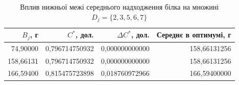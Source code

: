 \begin{table}[htbp]
\centering\small
\caption{Вплив нижньої межі середнього надходження білка на множині $D_j=\{2,3,5,6,7\}$}
\label{tab:glpk-multiday-protein}
\begin{tabular}{rrrr}
\toprule
$B_j$, г & $C^*$, дол. & $\Delta C^*$, дол. & Середнє в оптимумі, г \\
\midrule
74{,}90000 & 0{,}796714750932 & 0{,}000000000000 & 158{,}66131256 \\
158{,}66131 & 0{,}796714750932 & 0{,}000000000000 & 158{,}66131256 \\
166{,}59400 & 0{,}815475723898 & 0{,}018760972966 & 166{,}59400000 \\
\bottomrule
\end{tabular}
\end{table}
